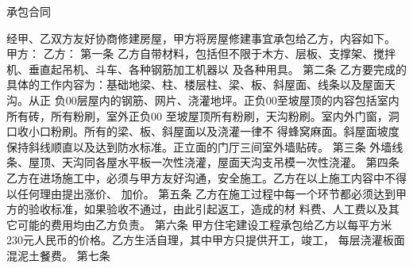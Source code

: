 \documentclass[12pt,a4paper]{article}
\begin{document}
\begin{center}
  \begin{Huge}
    承包合同
  \end{Huge}
\end{center}
经甲、乙双方友好协商修建房屋，甲方将房屋修建事宜承包给乙方，内容如下。
\newline{}
\newline{}
甲方：
\newline{}
\newline{}
乙方：
\newline{}
\newline{}
第一条
\newline{}
乙方自带材料，包括但不限于木方、层板、支撑架、搅拌机、垂直起吊机、斗车、各种钢筋加工机器以
及各种用具。
\newline{}
\newline{}
第二条
\newline{}
乙方要完成的具体的工作内容为：基础地梁、柱、楼层柱、梁、板、斜屋面、线条以及屋面天沟。从正
负00层屋内的钢筋、网片、浇灌地坪。正负00至坡屋顶的内容包括室内所有砖，所有粉刷，室外正负00
至坡屋顶所有粉刷，天沟粉刷。室内外门窗，洞口收小口粉刷。所有的梁、板、斜屋面以及浇灌一律不
得蜂窝麻面。斜屋面坡度保持斜线顺直以及达到防水标准。正立面的门厅三间室外墙贴砖。
\newline{}
\newline{}
第三条
\newline{}
外墙线条、屋顶、天沟同各屋水平板一次性浇灌，屋面天沟支吊模一次性浇灌。
\newline{}
\newline{}
第四条
\newline{}
乙方在进场施工中，必须与甲方友好沟通，安全施工。乙方在以上施工内容中不得以任何理由提出涨价、
加价。
\newline{}
\newline{}
第五条
\newline{}
乙方在施工过程中每一个环节都必须达到甲方的验收标准，如果验收不通过，由此引起返工，造成的材
料费、人工费以及其它可能的费用均由乙方负责。
\newline{}
\newline{}
第六条
\newline{}
甲方住宅建设工程承包给乙方以每平方米230元人民币的价格。乙方生活自理，其中甲方只提供开工，竣工，
每层浇灌板面混泥土餐费。
\newline{}
\newline{}
第七条
\newline{}
\end{document}
